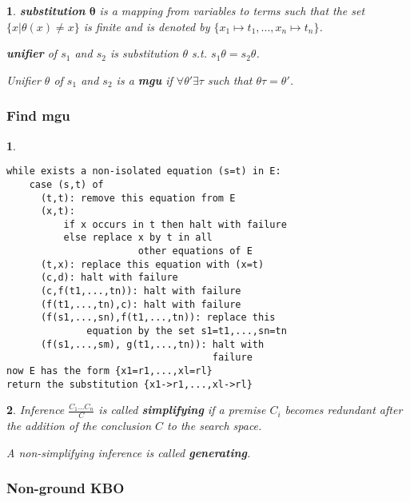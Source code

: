 \documentclass[]{article}
\newtheorem*{green}{}
\newtheorem*{red}{}
\begin{document}
\begin{multicols}{3}
\begin{minipage}[t]{.31\textwidth}
\begin{green}
\textbf{substitution} $\mathbf{\theta}$ is a mapping from variables to terms such that the set $\{x | \theta(x) \not= x\}$ is finite and is denoted by $\{x_1 \mapsto t_1, ..., x_n \mapsto t_n\}$.

\textbf{unifier} of $s_1$ and $s_2$ is substitution $\theta$ s.t. $s_1\theta = s_2\theta$.

Unifier $\theta$ of $s_1$ and $s_2$ is a \textbf{mgu} if $\forall\theta' \exists\tau$ such that $\theta\tau = \theta'$.
\end{green}

\subsubsection*{Find mgu}
\begin{red}
\begin{verbatim}
while exists a non-isolated equation (s=t) in E:
    case (s,t) of
      (t,t): remove this equation from E
      (x,t):
          if x occurs in t then halt with failure
          else replace x by t in all
                       other equations of E
      (t,x): replace this equation with (x=t)
      (c,d): halt with failure
      (c,f(t1,...,tn)): halt with failure
      (f(t1,...,tn),c): halt with failure
      (f(s1,...,sn),f(t1,...,tn)): replace this
              equation by the set s1=t1,...,sn=tn
      (f(s1,...,sm), g(t1,...,tn)): halt with
                                    failure
now E has the form {x1=r1,...,xl=rl}
return the substitution {x1->r1,...,xl->rl}
\end{verbatim}
\end{red}

\begin{green}
Inference $\frac{C_1 ... C_n}{C}$ is called \textbf{simplifying} if a premise $C_i$ becomes redundant after the addition of the conclusion $C$ to the search space.
	
A non-simplifying inference is called \textbf{generating}.
\end{green}

\end{minipage}\hfil

\begin{minipage}[t]{.31\textwidth}

\subsubsection*{Non-ground KBO}


\end{minipage}
\end{multicols}
\end{document}
